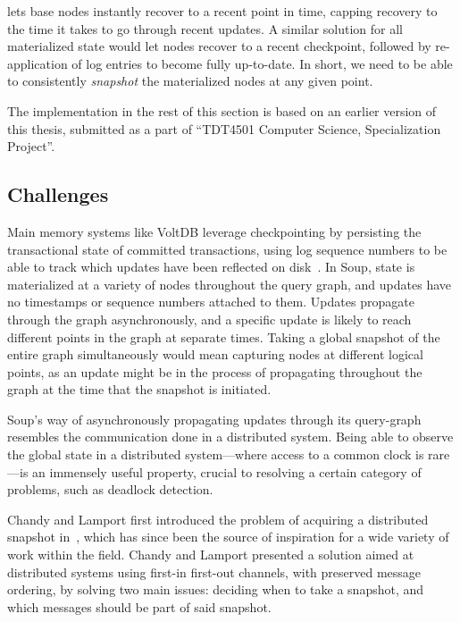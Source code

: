 lets base nodes instantly recover to a recent point in
time, capping recovery to the time it takes to go through recent updates. A
similar solution for all materialized state would let nodes recover to a recent
checkpoint, followed by re-application of log entries to become fully
up-to-date. In short, we need to be able to consistently \textit{snapshot} the
materialized nodes at any given point.

The implementation in the rest of this section is based on an earlier version of
this thesis, submitted as a part of ``TDT4501 Computer Science, Specialization
Project''.


\subsection{Challenges}

Main memory systems like VoltDB leverage checkpointing by persisting the
transactional state of committed transactions, using log sequence numbers to be
able to track which updates have been reflected on disk~\cite{voltdb-recovery}.
In Soup, state is materialized at a variety of nodes throughout the query graph,
and updates have no timestamps or sequence numbers attached to them. Updates
propagate through the graph asynchronously, and a specific update is likely to
reach different points in the graph at separate times. Taking a global snapshot
of the entire graph simultaneously would mean capturing nodes at different
logical points, as an update might be in the process of propagating throughout
the graph at the time that the snapshot is initiated.

Soup's way of asynchronously propagating updates through its query-graph
resembles the communication done in a distributed system. Being able to observe
the global state in a distributed system---where access to a common clock is
rare---is an immensely useful property, crucial to resolving a certain category
of problems, such as deadlock detection.

Chandy and Lamport first introduced the problem of acquiring a distributed
snapshot in~\cite{chandy-lamport}, which has since been the source of
inspiration for a wide variety of work within the field. Chandy and Lamport
presented a solution aimed at distributed systems using first-in first-out
channels, with preserved message ordering, by solving two main issues: deciding
when to take a snapshot, and which messages should be part of said snapshot.

